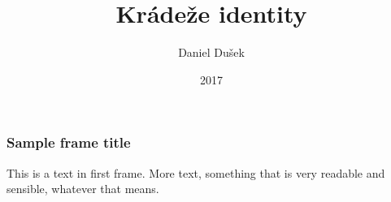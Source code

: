 \documentclass{beamer}
\title{Krádeže identity}
\author{Daniel Dušek}
\institute{Brno University of Technology}
\date{2017}
\begin{document}
	\begin{frame}
	\frametitle{Sample frame title}
	This is a text in first frame. More text, something that is very readable and sensible, whatever that means.
	\end{frame}
\end{document}
